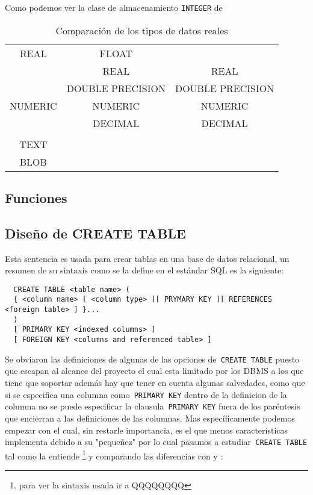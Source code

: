 Como podemos ver la clase de almacenamiento \verb=INTEGER= de \s

\begin{table}
\begin{center}
\begin{tabular}{|c|c|c|}
\hline \s & \m & \p \\  
\hline REAL & FLOAT &  \\ 
  & REAL & REAL \\
  & DOUBLE PRECISION & DOUBLE PRECISION \\
\hline NUMERIC & NUMERIC & NUMERIC \\
  & DECIMAL & DECIMAL \\
\hline  &  &  \\  
 TEXT &  &  \\ 
 BLOB &  &  \\ 
\hline 
\end{tabular} 
\end{center}
\caption{Comparación de los tipos de datos reales}
\end{table}

\subsection{Funciones}




\subsection{Diseño de CREATE TABLE}
Esta sentencia es usada para crear tablas en una base de datos relacional, un resumen de su sintaxis como se la define en el estándar SQL es la siguiente:
\begin{Verbatim}
  CREATE TABLE <table name> (
  { <column name> [ <column type> ][ PRYMARY KEY ][ REFERENCES <foreign table> ] }...
  )
  [ PRIMARY KEY <indexed columns> ]
  [ FOREIGN KEY <columns and referenced table> ]
\end{Verbatim}
Se obviaron las definiciones de algunas de las opciones de\verb= CREATE TABLE= puesto que escapan al alcance del proyecto el cual esta limitado por los DBMS a los que tiene que soportar además hay que tener en cuenta algunas salvedades, como que si se especifica una columna como\verb= PRIMARY KEY= dentro de la definicion de la columna no se puede especificar la clausula\verb= PRIMARY KEY= fuera de los paréntesis que encierran a las definiciones de las columnas. Mas específicamente podemos empezar con \s el cual, sin restarle importancia, es el que menos características implementa debido a su "pequeñez" por lo cual pasamos a estudiar\verb= CREATE TABLE= tal como la entiende \s\footnote{para ver la sintaxis usada ir a QQQQQQQQ} y comparando las diferencias con \m y \p:

